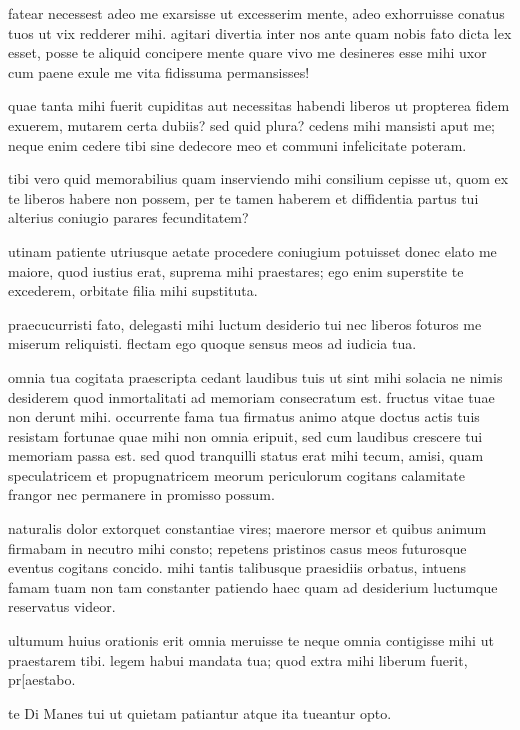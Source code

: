 fatear necessest adeo me exarsisse ut excesserim mente, adeo exhorruisse conatus tuos ut vix redderer mihi. agitari divertia inter nos ante quam nobis fato dicta lex esset, posse te aliquid concipere mente quare vivo me desineres esse mihi uxor cum paene exule me vita fidissuma permansisses!

quae tanta mihi fuerit cupiditas aut necessitas habendi liberos ut propterea fidem exuerem, mutarem certa dubiis? sed quid plura? cedens mihi mansisti aput me; neque enim cedere tibi sine dedecore meo et communi infelicitate poteram.

tibi vero quid memorabilius quam inserviendo mihi consilium cepisse ut, quom ex te liberos habere non possem, per te tamen haberem et diffidentia partus tui alterius coniugio parares fecunditatem?

utinam patiente utriusque aetate procedere coniugium potuisset donec elato me maiore, quod iustius erat, suprema mihi praestares; ego enim superstite te excederem, orbitate filia mihi supstituta. 

praecucurristi fato, delegasti mihi luctum desiderio tui nec liberos foturos me miserum reliquisti. flectam ego quoque sensus meos ad iudicia tua. 

omnia tua cogitata praescripta cedant laudibus tuis ut sint mihi solacia ne nimis desiderem quod inmortalitati ad memoriam consecratum est. fructus vitae tuae non derunt mihi. occurrente fama tua firmatus animo atque doctus actis tuis resistam fortunae quae mihi non omnia eripuit, sed cum laudibus crescere tui memoriam passa est. sed quod tranquilli status erat mihi tecum, amisi, quam speculatricem et propugnatricem meorum periculorum cogitans calamitate frangor nec permanere in promisso possum. 

naturalis dolor extorquet constantiae vires; maerore mersor et quibus animum firmabam in necutro mihi consto; repetens pristinos casus meos futurosque eventus cogitans concido. mihi tantis talibusque praesidiis orbatus, intuens famam tuam non tam constanter patiendo haec quam ad desiderium luctumque reservatus videor. 

ultumum huius orationis erit omnia meruisse te neque omnia contigisse mihi ut praestarem tibi. legem habui mandata tua; quod extra mihi liberum fuerit, pr[aestabo. 

te Di Manes tui ut quietam patiantur atque ita tueantur opto.


